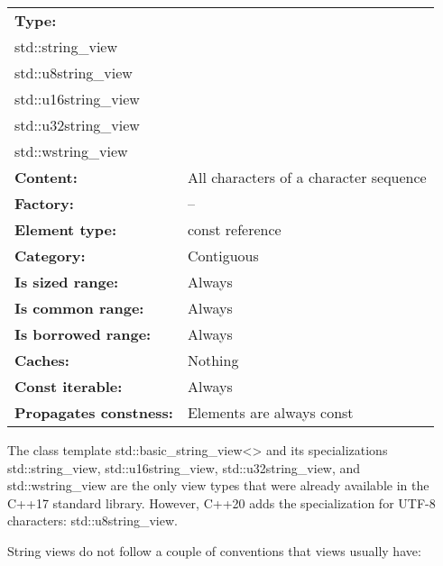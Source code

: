 \begin{longtable}[c]{|l|l|}
\hline
\textbf{Type:} &
\begin{tabular}[c]{@{}l@{}}std::basic\_string\_view\textless{}\textgreater\\ std::string\_view\\ std::u8string\_view\\ std::u16string\_view\\ std::u32string\_view\\ std::wstring\_view\end{tabular} \\ \hline
\endfirsthead
%
\endhead
%
\textbf{Content:}              & All characters of a character sequence \\ \hline
\textbf{Factory:}              & --                                     \\ \hline
\textbf{Element type:}         & const reference                        \\ \hline
\textbf{Category:}             & Contiguous                             \\ \hline
\textbf{Is sized range:}       & Always                                 \\ \hline
\textbf{Is common range:}      & Always                                 \\ \hline
\textbf{Is borrowed range:}    & Always                                 \\ \hline
\textbf{Caches:}               & Nothing                                \\ \hline
\textbf{Const iterable:}       & Always                                 \\ \hline
\textbf{Propagates constness:} & Elements are always const              \\ \hline
\end{longtable}

The class template std::basic\_string\_view<> and its specializations std::string\_view, std::u16string\_view, std::u32string\_view, and std::wstring\_view are the only view types that were already available in the C++17 standard library. However, C++20 adds the specialization for UTF-8 characters: std::u8string\_view.

String views do not follow a couple of conventions that views usually have:

